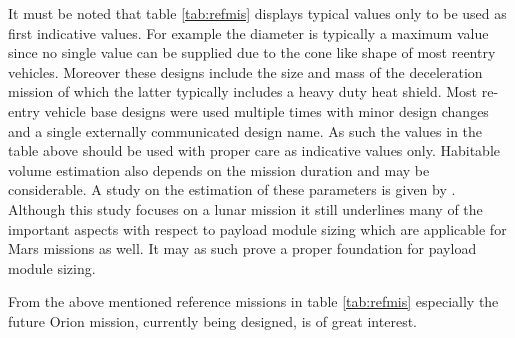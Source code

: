 It must be noted that table \ref{tab:refmis} displays typical values only to be used as first indicative values. For example the diameter is typically a maximum value since no single value can be supplied due to the cone like shape of most reentry vehicles. Moreover these designs include the size and mass of the deceleration mission of which the latter typically includes a heavy duty heat shield. Most re-entry vehicle base designs were used multiple times with minor design changes and a single externally communicated design name. As such the values in the table above should be used with proper care as indicative values only. Habitable volume estimation also depends on the mission duration and may be considerable. A study on the estimation of these parameters is given by \cite{Rudisill2008}. Although this study focuses on a lunar mission it still underlines many of the important aspects with respect to payload module sizing which are applicable for Mars missions as well. It may as such prove a proper foundation for payload module sizing. 

From the above mentioned reference missions in table \ref{tab:refmis} especially the future Orion mission, currently being designed, is of great interest. 
